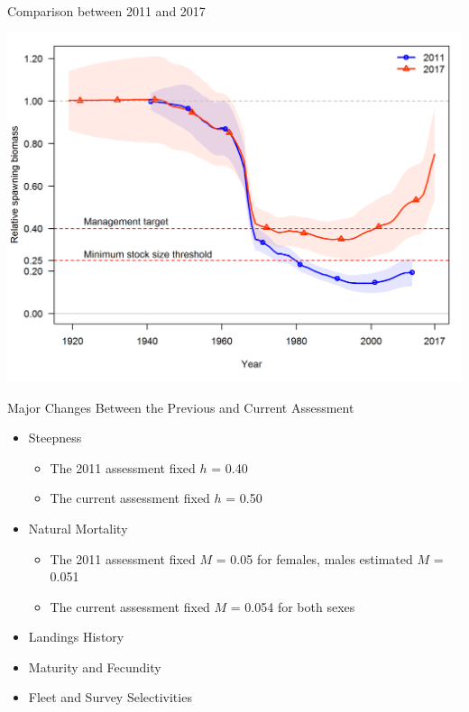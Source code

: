 \documentclass[pdf]{beamer}\usepackage[]{graphicx}\usepackage[]{color}
\begin{document}
\begin{frame}{Comparison between 2011 and 2017}
  \begin{center}
    \includegraphics[scale = 0.50]{figures/2011_2017_Bratio.png}
  \end{center}
\end{frame}

\begin{frame}{Major Changes Between the Previous and Current Assessment}
  \begin{itemize}
    \item Steepness 
      \begin{itemize}
        \item The 2011 assessment fixed $h$ = 0.40
        \item The current assessment fixed $h$ = 0.50 
      \end{itemize}
    \item Natural Mortality
      \begin{itemize}
        \item The 2011 assessment fixed $M$ = 0.05 for females, males estimated $M$ = 0.051
        \item The current assessment fixed $M$ = 0.054 for both sexes
      \end{itemize}
    \item Landings History
    \item Maturity and Fecundity
    \item Fleet and Survey Selectivities 
  \end{itemize}
\end{frame}
\end{document}
